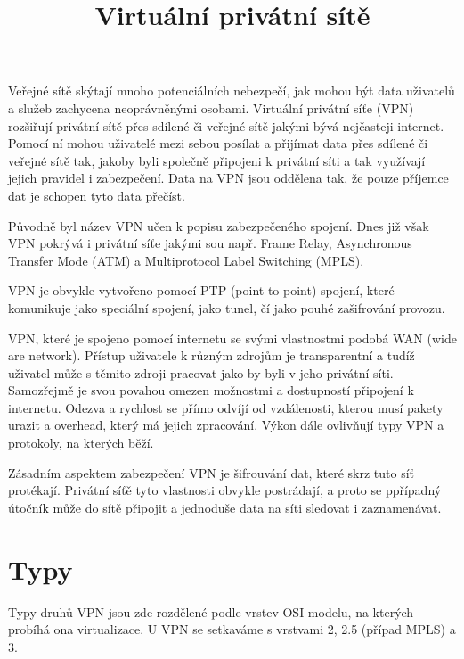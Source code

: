 \documentclass[thesis=B,czech]{FITthesis}[2012/06/26]
\title{Virtuální privátní sítě}
\begin{document}

\begin{introduction}
  \label{sec:uvod}

  Veřejné sítě skýtají mnoho potenciálních nebezpečí, jak mohou být data uživatelů a služeb zachycena neoprávněnými osobami.
  Virtuální privátní síťe (VPN) rozšiřují privátní sítě přes sdílené či veřejné sítě jakými bývá nejčasteji internet.
  Pomocí ní mohou uživatelé mezi sebou posílat a přijímat data přes sdílené či veřejné sítě tak, jakoby byli společně připojeni k privátní síti a tak využívají jejich pravidel i zabezpečení. \cite{cisco_intro}
  Data na VPN jsou oddělena tak, že pouze příjemce dat je schopen tyto data přečíst.  \cite{netgear_vpn_basics}

  Původně byl název VPN učen k popisu zabezpečeného spojení. Dnes již však VPN pokrývá i privátní síťe jakými sou např. Frame Relay, Asynchronous Transfer Mode (ATM) a Multiprotocol Label Switching (MPLS).

  VPN je obvykle vytvořeno pomocí PTP (point to point) spojení, které komunikuje jako speciální spojení, jako tunel, čí jako pouhé zašifrování provozu.

  VPN, které je spojeno pomocí internetu se svými vlastnostmi podobá WAN (wide are network). Přístup uživatele k různým zdrojům je transparentní a tudíž uživatel může s těmito zdroji pracovat jako by byli v jeho privátní síti. Samozřejmě je svou povahou omezen možnostmi a dostupností připojení k internetu. Odezva a rychlost se přímo odvíjí od vzdálenosti, kterou musí pakety urazit a overhead, který má jejich zpracování. Výkon dále ovlivňují typy VPN a protokoly, na kterých běží. \cite{microsoft_intro}

  Zásadním aspektem zabezpečení VPN je šifrouvání dat, které skrz tuto síť protékají. Privátní síťě tyto vlastnosti obvykle postrádají, a proto se ppřípadný útočník může do sítě připojit a jednoduše data na síti sledovat i zaznamenávat. \cite{netgear_vpn_basics}

\end{introduction}

\chapter{Typy}

  Typy druhů VPN jsou zde rozdělené podle vrstev OSI modelu, na kterých probíhá ona virtualizace. U VPN se setkaváme s vrstvami 2, 2.5 (případ MPLS) a 3.
\end{document}
